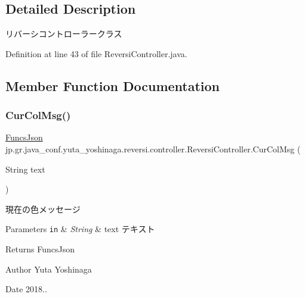 \subsection{Detailed Description}
リバーシコントローラークラス 

Definition at line 43 of file Reversi\+Controller.\+java.



\subsection{Member Function Documentation}
\mbox{\label{classjp_1_1gr_1_1java__conf_1_1yuta__yoshinaga_1_1reversi_1_1controller_1_1_reversi_controller_aa4c4d8fe61727c848170cff7120e82db}} 
\subsubsection{\texorpdfstring{Cur\+Col\+Msg()}{CurColMsg()}}
{\footnotesize\ttfamily \hyperlink{classjp_1_1gr_1_1java__conf_1_1yuta__yoshinaga_1_1reversi_1_1model_1_1_funcs_json}{Funcs\+Json} jp.\+gr.\+java\+\_\+conf.\+yuta\+\_\+yoshinaga.\+reversi.\+controller.\+Reversi\+Controller.\+Cur\+Col\+Msg (\begin{DoxyParamCaption}\item[{String}]{text }\end{DoxyParamCaption})}



現在の色メッセージ 


\begin{DoxyParams}[1]{Parameters}
\mbox{\tt in}  & {\em String} & text テキスト \\
\hline
\end{DoxyParams}
\begin{DoxyReturn}{Returns}
Funcs\+Json 
\end{DoxyReturn}
\begin{DoxyAuthor}{Author}
Yuta Yoshinaga 
\end{DoxyAuthor}
\begin{DoxyDate}{Date}
2018.. 
\end{DoxyDate}


